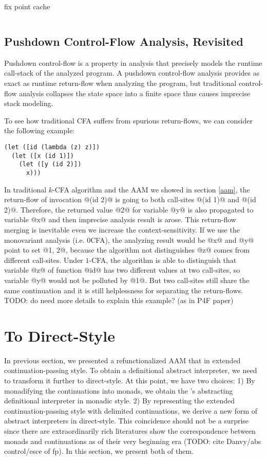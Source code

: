\documentclass[acmsmall,review,anonymous]{acmart}\settopmatter{printfolios=true,printccs=false,printacmref=false}
\begin{document}
fix point cache

\begin{lstlisting}
\end{lstlisting}

\subsection{Pushdown Control-Flow Analysis, Revisited} \label{pdcfarevisit}

Pushdown control-flow is a property in analysis that precisely models
the runtime call-stack of the analyzed program. 
A pushdown control-flow analysis provides as exact as runtime return-flow 
when analyzing the program, but traditional control-flow analysis collapses 
the state space into a finite space thus causes imprecise stack modeling.

To see how traditional CFA suffers from spurious return-flows, 
we can consider the following example:

\begin{lstlisting}
(let ([id (lambda (z) z)])
  (let ([x (id 1)])
    (let ([y (id 2)])
      x)))
\end{lstlisting}

In traditional $k$-CFA algorithm and the AAM we showed in section \ref{aam}, 
the return-flow of invocation @(id 2)@
is going to both call-sites @(id 1)@ and @(id 2)@. Therefore, the
returned value @2@ for variable @y@ is also propagated to 
variable @x@ and then imprecise analysis result is arose.
This return-flow merging is inevitable even we increase the context-sensitivity.
If we use the monovariant analysis (i.e. 0CFA), the analyzing result would be @x@ and 
@y@ point to set @{1, 2}@, because the algorithm not distinguishes
@z@ comes from different call-sites.
Under $1$-CFA, the algorithm is able to distinguish that variable @z@ of function
@id@ has two different values at two call-sites, so variable @y@ 
would not be polluted by @1@. 
But two call-sites still share the same continuation and
it is still helplessness for separating the return-flows.
TODO: do need more details to explain this example? (as in P4F paper)

\section{To Direct-Style}

In previous section, we presented a refunctionalized AAM that in extended continuation-passing style. 
To obtain a definitional abstract interpreter, we need to transform it further to direct-style. 
At this point, we have two choices: 
1) By monadifying the continuations into monads, we obtain the \citeauthor{darais2017abstracting}'s 
abstracting definitional interpreter in monadic style.
2) By representing the extended continuation-passing style with delimited continuations,
we derive a new form of abstract interpreters in direct-style.
This coincidence should not be a surprise since there are extraordinarily rich literatures 
show the correspondence between monads and continuations as of their very beginning era
(TODO: cite Danvy/abs control/esce of fp).
In this section, we present both of them.
\end{document}
